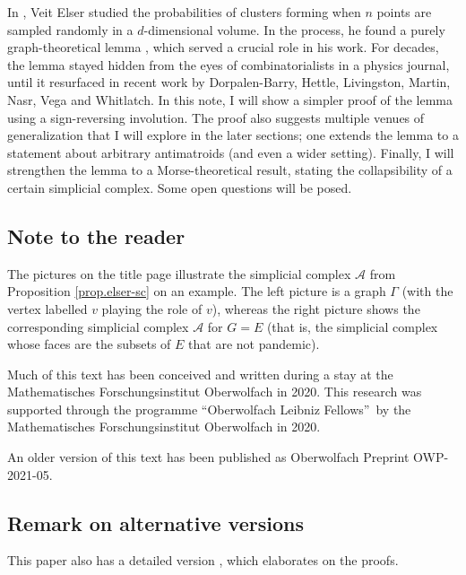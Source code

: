 \documentclass[numbers=enddot,12pt,final,onecolumn]{scrartcl}%
\theoremstyle{definition}
\newenvironment{vershort}{}{}
\begin{document}
In \cite{Elser84}, Veit Elser studied the probabilities of clusters forming
when $n$ points are sampled randomly in a $d$-dimensional volume. In the
process, he found a purely graph-theoretical lemma \cite[Lemma 1]{Elser84},
which served a crucial role in his work. For decades, the lemma stayed hidden
from the eyes of combinatorialists in a physics journal, until it resurfaced
in recent work \cite{DHLetc19} by Dorpalen-Barry, Hettle, Livingston, Martin,
Nasr, Vega and Whitlatch. In this note, I will show a simpler proof of the
lemma using a sign-reversing involution. The proof also suggests multiple
venues of generalization that I will explore in the later sections; one
extends the lemma to a statement about arbitrary antimatroids (and even a
wider setting). Finally, I will strengthen the lemma to a Morse-theoretical
result, stating the collapsibility of a certain simplicial complex. Some open
questions will be posed.

\subsection*{Note to the reader}

The pictures on the title page illustrate the simplicial complex $\mathcal{A}$
from Proposition \ref{prop.elser-sc} on an example. The left picture is a
graph $\Gamma$ (with the vertex labelled $v$ playing the role of $v$), whereas
the right picture shows the corresponding simplicial complex $\mathcal{A}$ for
$G=E$ (that is, the simplicial complex whose faces are the subsets of $E$ that
are not pandemic).

Much of this text has been conceived and written during a stay at the
Mathematisches Forschungsinstitut Oberwolfach in 2020. This research was
supported through the programme \textquotedblleft Oberwolfach Leibniz
Fellows\textquotedblright\ by the Mathematisches Forschungsinstitut
Oberwolfach in 2020.

An older version of this text has been published as Oberwolfach Preprint OWP-2021-05.

\subsection*{Remark on alternative versions}

\begin{vershort}
This paper also has a detailed version \cite{verlong}, which elaborates on the proofs.
\end{vershort}
\end{document}
